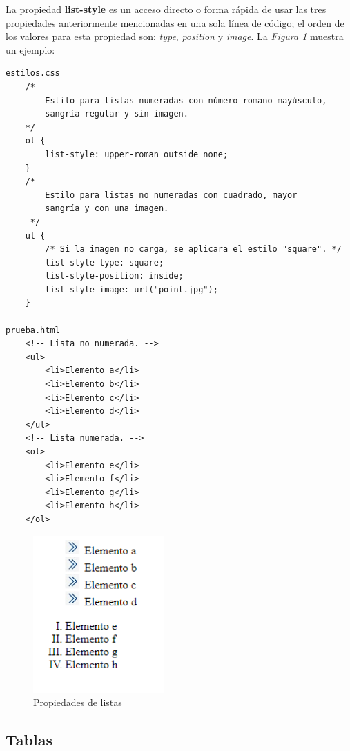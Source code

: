 La propiedad \textbf{list-style} es un acceso directo o forma rápida de usar las tres propiedades anteriormente mencionadas en una sola línea de código; el orden de los valores para esta propiedad son: \textit{type}, \textit{position} y \textit{image}. La \textit{Figura \ref{fig: 22}} muestra un ejemplo:
\begin{lstlisting}
estilos.css
    /*
        Estilo para listas numeradas con número romano mayúsculo,
        sangría regular y sin imagen.
    */
    ol {
        list-style: upper-roman outside none;
    }
    /*
        Estilo para listas no numeradas con cuadrado, mayor
        sangría y con una imagen.
     */
    ul {
        /* Si la imagen no carga, se aplicara el estilo "square". */
        list-style-type: square;
        list-style-position: inside;
        list-style-image: url("point.jpg");
    }

prueba.html
    <!-- Lista no numerada. -->
    <ul>
        <li>Elemento a</li>
        <li>Elemento b</li>
        <li>Elemento c</li>
        <li>Elemento d</li>
    </ul>
    <!-- Lista numerada. -->
    <ol>
        <li>Elemento e</li>
        <li>Elemento f</li>
        <li>Elemento g</li>
        <li>Elemento h</li>
    </ol>
\end{lstlisting}
\begin{figure}[H]
    \centering
    \caption{Propiedades de listas}
    \label{fig: 22}
    \includegraphics[width=5cm]{ss/lists.png}
\end{figure}


\subsection{Tablas}

